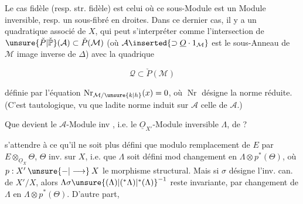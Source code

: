 
Le cas  fidèle (resp. str. fidèle) est celui où ce sous-Module est un Module inversible, resp. un sous-fibré en droites. Dans ce dernier cas, il  y a un  quadratique associé de $X$, qui peut s'interpréter comme l'intersection de $\unsure{\check P|\check{\mathbb P}}(\mathcal A)\subset\check P(\mathcal M)$ (où $\mathcal A\inserted{\supset\underline O\cdot1_{\mathcal M}}$ est le sous-Anneau de $\mathcal M$ image inverse de $\Delta$) avec la quadrique

\[
\mathcal Q\subset\check P(\mathcal M)
\]

définie par l'équation $\operatorname{Nr}_{\mathcal M/\unsure{k|h}}(x)=0$, où $\operatorname{Nr}$ désigne la norme réduite. (C'est tautologique, vu que ladite norme induit sur $\mathcal A$ celle de $\mathcal A$.)

Que devient le $\mathcal A$-Module inv , i.e. le $\underline O_{X'}$-Module inversible $\Lambda$, de  ?

 s'attendre à ce qu'il ne soit plus défini que modulo remplacement de $E$ par $E\otimes_{\underline O_X}\Theta$, $\Theta$ inv. sur $X$, i.e. que $\Lambda$ soit défini mod changement en $\Lambda\otimes p^*(\Theta)$, où $p:X'\mathbin{\unsure{-|\longrightarrow}}X$ le morphisme structural. Mais si $\sigma$ désigne l'inv. can. de $X'/X$, alors $\Lambda\sigma{\unsure{(\Lambda)|({}^*\Lambda)|^*(\Lambda)}}^{-1}$ reste invariante, par changement de $\Lambda$ en $\Lambda\otimes p^*(\Theta)$. D'autre part,

